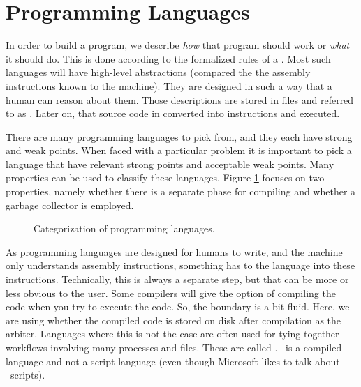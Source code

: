 \section{Programming Languages}
\label{sec:lang}

\begin{inspiration}{\cite{progLangJurassicPark}}
\end{inspiration}

In order to build a program, we describe \textsl{how} that program should work or \textsl{what} it should do. This is done according to the formalized rules of a . Most such languages will have high-level abstractions (compared the the assembly instructions known to the machine). They are designed in such a way that a human can reason about them. Those descriptions are stored in files and referred to as . Later on, that source code in converted into instructions and executed.

There are many programming languages to pick from, and they each have strong and weak points. When faced with a particular problem it is important to pick a language that have relevant strong points and acceptable weak points. Many properties can be used to classify these languages. Figure \ref{fig:background:lang:categorization} focuses on two properties, namely whether there is a separate phase for compiling and whether a garbage collector is employed.

\begin{figure}[tbp]
  
  \caption{Categorization of programming languages.}
  \label{fig:background:lang:categorization}
\end{figure}

As programming languages are designed for humans to write, and the machine only understands assembly instructions, something has to  the language into these instructions. Technically, this is always a separate step, but that can be more or less obvious to the user. Some compilers will give the option of compiling the code when you try to execute the code. So, the boundary is a bit fluid. Here, we are using whether the compiled code is stored on disk after compilation as the arbiter. Languages where this is not the case are often used for tying together workflows involving many processes and files. These are called . \csharp\ is a compiled language and not a script language (even though Microsoft likes to talk about \csharp\ scripts).

